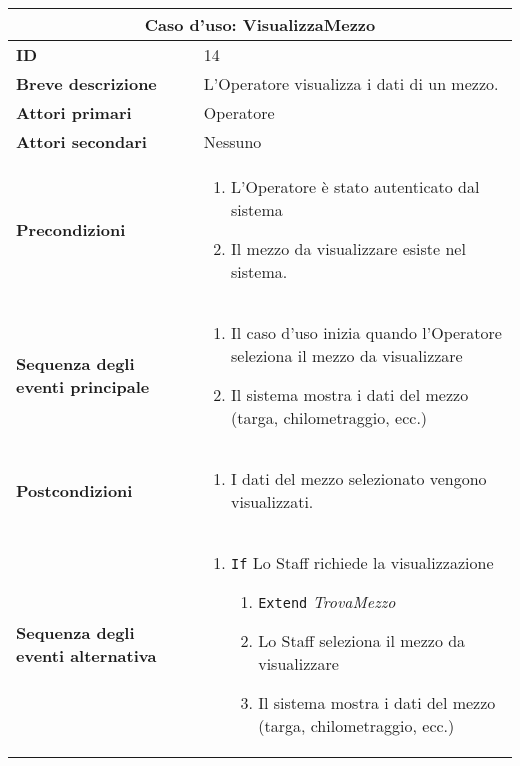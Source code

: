 \documentclass[a4paper]{report}
\begin{document}
\clearpage
\begin{table}[H]
\vspace*{-0cm}
\renewcommand{\arraystretch}{1.9}
\begin{tabular}{|p{3.9cm}|p{9.9cm}|}
\hline
\multicolumn{2}{|c|}{\textbf{Caso d’uso: VisualizzaMezzo}} \\ \hline
	\textbf{ID} & 14 \\ \hline
	\textbf{Breve descrizione} & L'Operatore visualizza i dati di un mezzo. \\ \hline
	\textbf{Attori primari} & Operatore \\ \hline
	\textbf{Attori secondari} & Nessuno \\ \hline
	\textbf{Precondizioni} & \begin{enumerate}[label=\arabic*.,leftmargin=14pt,labelsep=0.5em,topsep=0pt,partopsep=0pt,parsep=0pt,itemsep=0pt]
        \item L’Operatore è stato autenticato dal sistema
        \item Il mezzo da visualizzare esiste nel sistema.
    \end{enumerate} \\ \hline
    	\textbf{Sequenza degli eventi principale} & \begin{enumerate}[label=\arabic*.,leftmargin=14pt,labelsep=0.5em,topsep=0pt,partopsep=0pt,parsep=0pt,itemsep=0pt]
        \item Il caso d'uso inizia quando l'Operatore seleziona il mezzo da visualizzare
        \item Il sistema mostra i dati del mezzo (targa, chilometraggio, ecc.)
    \end{enumerate}\\ \hline
    	\textbf{Postcondizioni} & \begin{enumerate}[label=\arabic*.,leftmargin=14pt,labelsep=0.5em,topsep=0pt,partopsep=0pt,parsep=0pt,itemsep=0pt]
        \item I dati del mezzo selezionato vengono visualizzati.
    \end{enumerate}\\ \hline
    	\textbf{Sequenza degli eventi alternativa} & \begin{enumerate}[leftmargin=14pt,label=\arabic*.,labelsep=0.5em,topsep=0pt,partopsep=0pt,parsep=0pt,itemsep=0pt]
        \item \texttt{If} Lo Staff richiede la visualizzazione
        \begin{enumerate}[label=\arabic{enumi}.\arabic*.,leftmargin=22pt,labelsep=0.5em,topsep=0pt,partopsep=0pt,parsep=0pt,itemsep=0pt]
            \item \texttt{Extend} \textit{TrovaMezzo}
            \item Lo Staff seleziona il mezzo da visualizzare
            \item Il sistema mostra i dati del mezzo (targa, chilometraggio, ecc.)
        \end{enumerate}
    \end{enumerate} \\ \hline
\end{tabular}
\end{table}
\end{document}
